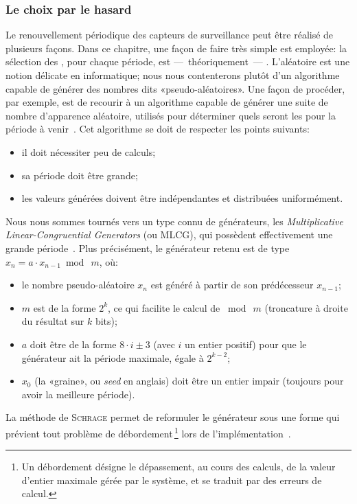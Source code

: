         \subsubsection{Le choix par le hasard}
Le renouvellement périodique des capteurs de surveillance peut être réalisé de plusieurs façons.
Dans ce chapitre, une façon de faire très simple est employée: la sélection des \cns, pour chaque période, est ---~théoriquement~--- .
L'aléatoire est une notion délicate en informatique; nous nous contenterons plutôt d'un algorithme capable de générer des nombres dits «pseudo-aléatoires».
Une façon de procéder, par exemple, est de recourir à un algorithme capable de générer une suite de nombre d'apparence aléatoire, utilisés pour déterminer quels seront les \cns pour la période à venir~\cite{BMM13}.
Cet algorithme se doit de respecter les points suivants:
\begin{itemize}
    \item il doit nécessiter peu de calculs;
    \item sa période doit être grande;
    \item les valeurs générées doivent être indépendantes et distribuées uniformément.
\end{itemize}
Nous nous sommes tournés vers un type connu de générateurs, les \textit{Multiplicative Linear-Congruential Generators} (ou MLCG), qui possèdent effectivement une grande période~\cite{RJ91}.
Plus précisément, le générateur retenu est de type $x_n = a\cdot x_{n-1}\bmod\ m$, où:
\begin{itemize}
    \item le nombre pseudo-aléatoire $x_n$ est généré à partir de son prédécesseur $x_{n-1}$;
    \item $m$ est de la forme $2^k$, ce qui facilite le calcul de $\bmod\ m$ (troncature à droite du résultat sur $k$ bits);
    \item $a$ doit être de la forme $8\cdot i\pm3$ (avec $i$ un entier positif) pour que le générateur ait la période maximale, égale à $2^{k-2}$;
    \item $x_0$ (la «graine», ou \textit{seed} en anglais) doit être un entier impair (toujours pour avoir la meilleure période).
\end{itemize}
La méthode de \textsc{Schrage} permet de reformuler le générateur sous une forme qui prévient tout problème de débordement\,\footnote{Un débordement désigne le dépassement, au cours des calculs, de la valeur d'entier maximale gérée par le système, et se traduit par des erreurs de calcul.} lors de l'implémentation~\cite{RJ91}.
